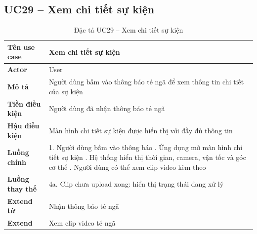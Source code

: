 \subsection*{UC29 -- Xem chi tiết sự kiện}
\begin{table}[H]
    \captionsetup{justification=raggedright, singlelinecheck=false}
    \caption{Đặc tả UC29 -- Xem chi tiết sự kiện}
\centering
\begin{tabular}{|p{3.5cm}|p{10cm}|}
\hline
\textbf{Tên use case} & Xem chi tiết sự kiện \\
\hline
\textbf{Actor} & User \\
\hline
\textbf{Mô tả} & Người dùng bấm vào thông báo té ngã để
  xem thông tin chi tiết của sự kiện \\
\hline
\textbf{Tiền điều kiện} & Người dùng đã nhận thông báo
  té ngã \\
\hline
\textbf{Hậu điều kiện} & Màn hình chi tiết sự kiện được
  hiển thị với đầy đủ thông tin \\
\hline
\textbf{Luồng chính} &
  1. Người dùng bấm vào thông báo \newline
  2. Ứng dụng mở màn hình chi tiết sự kiện \newline
  3. Hệ thống hiển thị thời gian, camera, vận tốc
     và góc cơ thể \newline
  4. Người dùng có thể xem clip video kèm theo \\
\hline
\textbf{Luồng thay thế} &
  4a. Clip chưa upload xong: hiển thị trạng thái
  đang xử lý \\
\hline
\textbf{Extend từ} & Nhận thông báo té ngã \\
\hline
\textbf{Extend} & Xem clip video té ngã \\
\hline
\end{tabular}

\end{table}

